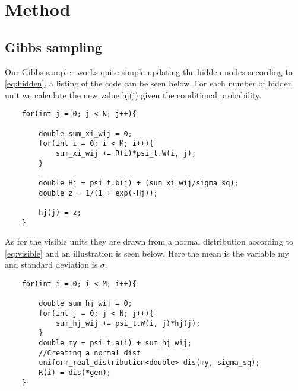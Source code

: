 \section{Method}

\subsection{Gibbs sampling}

Our Gibbs sampler works quite simple updating the hidden nodes according to \eqref{eq:hidden}, a listing of the code can be seen below. For each number of hidden unit we calculate the new value hj(j) given the conditional probability.

\begin{lstlisting}
    for(int j = 0; j < N; j++){

        double sum_xi_wij = 0;
        for(int i = 0; i < M; i++){
            sum_xi_wij += R(i)*psi_t.W(i, j);
        }

        double Hj = psi_t.b(j) + (sum_xi_wij/sigma_sq);
        double z = 1/(1 + exp(-Hj));

        hj(j) = z;
    }
\end{lstlisting}

As for the visible units they are drawn from a normal distribution according to \eqref{eq:visible} and an illustration is seen below. Here the mean is the variable my and standard deviation is $\sigma$.


\begin{lstlisting}
    for(int i = 0; i < M; i++){

        double sum_hj_wij = 0;
        for(int j = 0; j < N; j++){
            sum_hj_wij += psi_t.W(i, j)*hj(j);
        }
        double my = psi_t.a(i) + sum_hj_wij;
        //Creating a normal dist
        uniform_real_distribution<double> dis(my, sigma_sq);
        R(i) = dis(*gen);
    }
\end{lstlisting}

